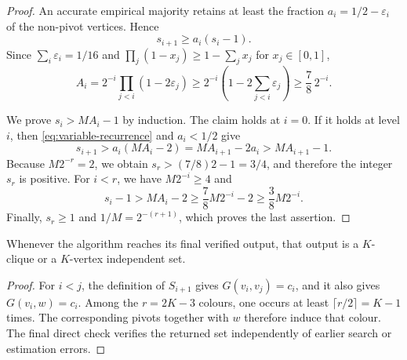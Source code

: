 \begin{proof}
An accurate empirical majority retains at least the fraction
$a_i=1/2-\varepsilon_i$ of the non-pivot vertices.  Hence
\begin{equation}\label{eq:variable-recurrence}
 s_{i+1}\ge a_i(s_i-1).
\end{equation}
Since $\sum_i\varepsilon_i=1/16$ and
$\prod_j(1-x_j)\ge1-\sum_jx_j$ for $x_j\in[0,1]$,
\[
 A_i
 =2^{-i}\prod_{j<i}(1-2\varepsilon_j)
 \ge2^{-i}\left(1-2\sum_{j<i}\varepsilon_j\right)
 \ge\frac78\,2^{-i}.
\]

We prove $s_i>MA_i-1$ by induction.  The claim holds at $i=0$.  If it holds
at level $i$, then \cref{eq:variable-recurrence} and $a_i<1/2$ give
\[
 s_{i+1}>a_i(MA_i-2)=MA_{i+1}-2a_i>MA_{i+1}-1.
\]
Because $M2^{-r}=2$, we obtain
$s_r>(7/8)2-1=3/4$, and therefore the integer $s_r$ is positive.  For $i<r$,
we have $M2^{-i}\ge4$ and
\[
 s_i-1>MA_i-2
 \ge\frac78M2^{-i}-2
 \ge\frac38M2^{-i}.
\]
Finally, $s_r\ge1$ and $1/M=2^{-(r+1)}$, which proves the last assertion.
\end{proof}

\begin{lemma}\label{lem:output}
Whenever the algorithm reaches its final verified output, that output is a
$K$-clique or a $K$-vertex independent set.
\end{lemma}

\begin{proof}
For $i<j$, the definition of $S_{i+1}$ gives
$G(v_i,v_j)=c_i$, and it also gives $G(v_i,w)=c_i$.  Among the
$r=2K-3$ colours, one occurs at least
$\lceil r/2\rceil=K-1$ times.  The corresponding pivots together with $w$
therefore induce that colour.  The final direct check verifies the returned
set independently of earlier search or estimation errors.
\end{proof}
